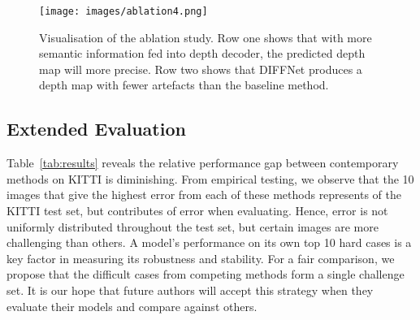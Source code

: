 \documentclass{bmvc2k}
\begin{document}
\begin{figure*}
 \centering
 \texttt{[image: images/ablation4.png]}
 \caption{Visualisation of the ablation study. Row one shows that with more semantic information fed into depth decoder, the predicted depth map will more precise. Row two shows that DIFFNet produces a depth map with fewer artefacts than the baseline method.}
 \label{fig:viausal_ablation}
 \end{figure*}
\subsection{Extended Evaluation}
Table~\ref{tab:results} reveals the relative performance gap between contemporary methods on KITTI is diminishing. 
From empirical testing, we observe that the 10 images that give the highest error from each of these methods represents  of the KITTI test set, but contributes  of error when evaluating. 
Hence, error is not uniformly distributed throughout the test set, but certain images are more challenging than others.
A model's performance on its own top 10 hard cases is a key factor in measuring its robustness and stability. 
For a fair comparison, we propose that the difficult cases from competing methods form a single challenge set. 
It is our hope that future authors will accept this strategy when they evaluate their models and compare against others.
\end{document}
